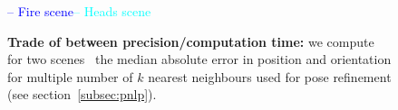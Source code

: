 \begin{figure}
\begin{minipage}{0.65\linewidth}
   		\vspace{0.2cm}
   		
   		\begin{footnotesize}
   				 \hfill\textcolor{blue}{{\Large --} Fire scene}\hfill\textcolor{cyan}{{\Large --} Heads scene}\hfill
   		\end{footnotesize}
   		
   	\end{minipage}\hfill
   	\begin{minipage}{0.35\linewidth}
   		\caption[Influence in number of kNN]{\textbf{Trade of between precision/computation time:}\label{fig:ratio_t_knn} we compute for two scenes~\citep{Shotton2013} the median absolute error in position and orientation for multiple number of $k$ nearest neighbours used for pose refinement (see section~\ref{subsec:pnlp}). }
   	\end{minipage}	
	
	
	
\end{figure}